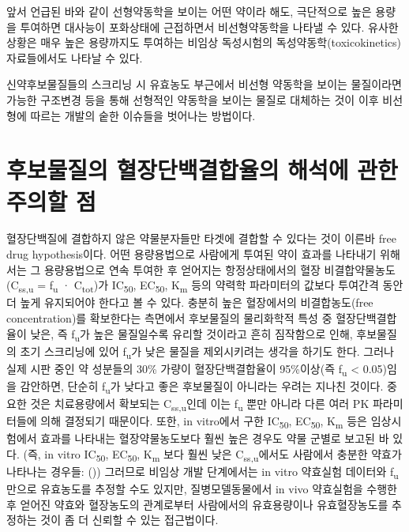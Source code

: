 \documentclass[
  11pt,
  krantz2, a4paper, twoside]{krantz}
\theoremstyle{definition}
\theoremstyle{definition}
\theoremstyle{definition}
\theoremstyle{definition}
\theoremstyle{remark}
\begin{document}
앞서 언급된 바와 같이 선형약동학을 보이는 어떤 약이라 해도, 극단적으로 높은 용량을 투여하면 대사능이 포화상태에 근접하면서 비선형약동학을 나타낼 수 있다. 
유사한 상황은 매우 높은 용량까지도 투여하는 비임상 독성시험의 독성약동학(toxicokinetics)자료들에서도 나타날 수 있다.

신약후보물질들의 스크리닝 시 유효농도 부근에서 비선형 약동학을 보이는 물질이라면 가능한 구조변경 등을 통해 선형적인 약동학을 보이는 물질로 대체하는 것이 이후 비선형에 따르는 개발의 숱한 이슈들을 벗어나는 방법이다.

\section{후보물질의 혈장단백결합율의 해석에 관한 주의할 점}\label{uxd6c4uxbcf4uxbb3cuxc9c8uxc758-uxd608uxc7a5uxb2e8uxbc31uxacb0uxd569uxc728uxc758-uxd574uxc11duxc5d0-uxad00uxd55c-uxc8fcuxc758uxd560-uxc810}

혈장단백질에 결합하지 않은 약물분자들만 타겟에 결합할 수 있다는 것이 이른바 free drug hypothesis이다.
어떤 용량용법으로 사람에게 투여된 약이 효과를 나타내기 위해서는 그 용량용법으로 연속 투여한 후 얻어지는 항정상태에서의 혈장 비결합약물농도(C\textsubscript{ss,u} = f\textsubscript{u} · C\textsubscript{tot})가 IC\textsubscript{50}, EC\textsubscript{50}, K\textsubscript{m} 등의 약력학 파라미터의 값보다 투여간격 동안 더 높게 유지되어야 한다고 볼 수 있다.
충분히 높은 혈장에서의 비결합농도(free concentration)를 확보한다는 측면에서 후보물질의 물리화학적 특성 중 혈장단백결합율이 낮은, 즉 f\textsubscript{u}가 높은 물질일수록 유리할 것이라고 흔히 짐작함으로 인해, 후보물질의 초기 스크리닝에 있어 f\textsubscript{u}가 낮은 물질을 제외시키려는 생각을 하기도 한다.
그러나 실제 시판 중인 약 성분들의 30\% 가량이 혈장단백결합율이 95\%이상(즉 f\textsubscript{u} \textless{} 0.05)임을 감안하면, 단순히 f\textsubscript{u}가 낮다고 좋은 후보물질이 아니라는 우려는 지나친 것이다.
중요한 것은 치료용량에서 확보되는 C\textsubscript{ss,u}인데 이는 f\textsubscript{u} 뿐만 아니라 다른 여러 PK 파라미터들에 의해 결정되기 때문이다. 또한, in vitro에서 구한 IC\textsubscript{50}, EC\textsubscript{50}, K\textsubscript{m} 등은 임상시험에서 효과를 나타내는 혈장약물농도보다 훨씬 높은 경우도 약물 군별로 보고된 바 있다.
(즉, in vitro IC\textsubscript{50}, EC\textsubscript{50}, K\textsubscript{m} 보다 훨씬 낮은 C\textsubscript{ss,u}에서도 사람에서 충분한 약효가 나타나는 경우들: ())
그러므로 비임상 개발 단계에서는 in vitro 약효실험 데이터와 f\textsubscript{u} 만으로 유효농도를 추정할 수도 있지만, 질병모델동물에서 in vivo 약효실험을 수행한 후 얻어진 약효와 혈장농도의 관계로부터 사람에서의 유효용량이나 유효혈장농도를 추정하는 것이 좀 더 신뢰할 수 있는 접근법이다.
\end{document}
